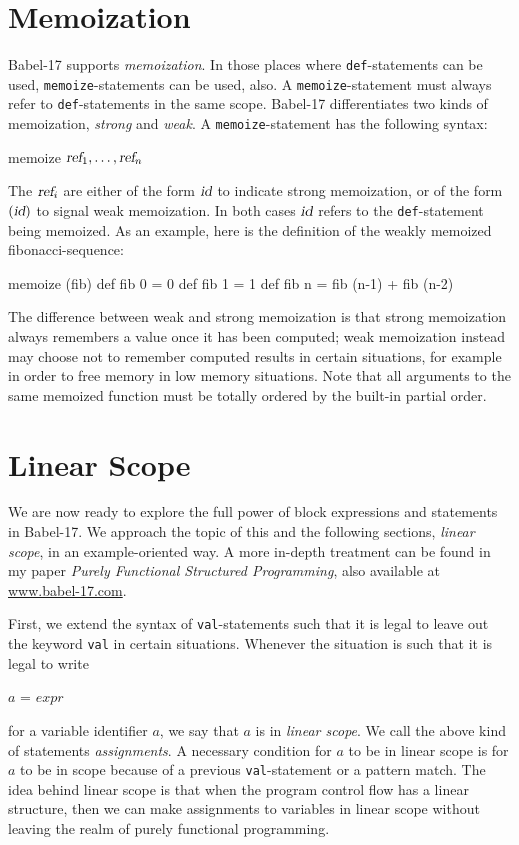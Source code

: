\documentclass[11pt]{amsart}
\newcommand{\metababel}[1] {\textsl{#1}}
\newcommand{\babelsrc}[1] {\lstinline!#1!}
\begin{document}
\section{Memoization}
Babel-17 supports \emph{memoization}. 
In those places where \babelsrc{def}-statements can be used, \babelsrc{memoize}-statements can be used, also. A \babelsrc{memoize}-statement must always refer to \babelsrc{def}-statements in the same scope. Babel-17 differentiates two kinds of memoization, \emph{strong} and \emph{weak}. A \babelsrc{memoize}-statement has the following syntax:
\begin{babellisting}
memoize $\metababel{ref}_1, \hdots, \metababel{ref}_n$
\end{babellisting}
The $\metababel{ref}_i$ are either of the form $\metababel{id}$ to indicate strong memoization, or of the form $(\metababel{id})$ to signal weak memoization. In both cases $\metababel{id}$ refers to the \babelsrc{def}-statement being memoized. As an example, here is the definition of the weakly memoized fibonacci-sequence:
\begin{babellisting}
memoize (fib)
def fib 0 = 0
def fib 1 = 1
def fib n = fib (n-1) + fib (n-2)
\end{babellisting}
The difference between weak and strong memoization is that strong memoization always remembers a value once it has been computed; weak memoization instead may choose not to remember computed results in certain situations, for example in order to free memory in low memory situations. Note that all arguments to the same memoized function must be totally ordered by the built-in partial order. 

\section{Linear Scope}
We are now ready to explore the full power of block expressions and statements in Babel-17. We approach the topic of this and the following sections, \emph{linear scope}, in an example-oriented way. A more in-depth treatment can be found in my paper \emph{Purely Functional Structured Programming}, also available at \url{www.babel-17.com}.

First, we extend the syntax of \babelsrc{val}-statements such that it is legal to leave out the keyword \babelsrc{val} in certain situations. Whenever the situation is such that it is legal to write
\begin{babellisting}
$a$ = $\textit{expr}$
\end{babellisting}
for a variable identifier $a$, we say that $a$ is in \emph{linear scope}. We call the above kind of statements \emph{assignments}. A necessary condition for $a$ to be in linear scope is for $a$ to be in scope because of a previous \babelsrc{val}-statement or a pattern match. 
The idea behind linear scope is that when the program control flow has a linear structure, then we can make assignments to variables in linear scope without leaving the realm of purely functional programming.
\end{document}
